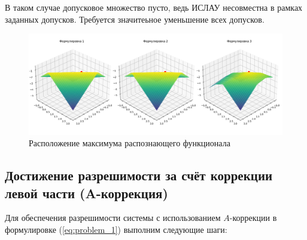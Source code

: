 \documentclass{article}
\begin{document}
  В таком случае допусковое множество пусто, ведь ИСЛАУ несовместна в рамках заданных допусков.
  Требуется значитеьное уменьшение всех допусков.
    \begin{figure}[htbp!]
        \begin{center}
            \includegraphics[width = \textwidth]{tol}
            \caption{Расположение максимума распознающего функционала}
    \label{figure:tol}
        \end{center}
    \end{figure}

    \subsection{Достижение разрешимости за счёт коррекции левой части (A-коррекция)}

    Для обеспечения разрешимости системы с использованием \( A \)-коррекции в формулировке (\ref{eq:problem_1}) выполним следующие шаги:
    
\end{document}

